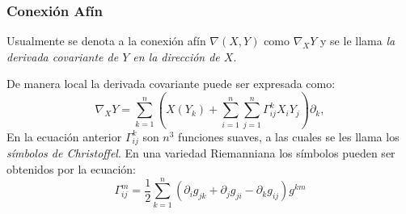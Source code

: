 \begin{frame}
	\frametitle{Conexión Afín}
	Usualmente se denota a la conexión afín $\nabla(X,Y)$ como $\nabla_{X}Y$ y se le llama \textit{la derivada covariante de $Y$ en la dirección de $X$}.

	\pause

	\vspace{12pt}

	De manera local la derivada covariante puede ser expresada como:
	\[
		\nabla_{X}Y = \sum_{k=1}^{n} \left(
		X(Y_{k}) + \sum_{i=1}^{n}\sum_{j=1}^{n} \Gamma_{ij}^{k} X_{i}Y_{j}
		\right) \partial_{k},
	\]\pause
	En la ecuación anterior $\Gamma_{ij}^{k}$ son $n^{3}$ funciones suaves, a las cuales se les llama los \textit{símbolos de Christoffel}. \pause En una variedad Riemanniana los símbolos pueden ser obtenidos por la ecuación:
	\[
		\Gamma_{ij}^{m} = \frac{1}{2} \sum_{k=1}^{n} (\partial_{i} g_{jk} + \partial_{j}g_{ji} - \partial_{k}g_{ij}) g^{km}
	\]
\end{frame}
